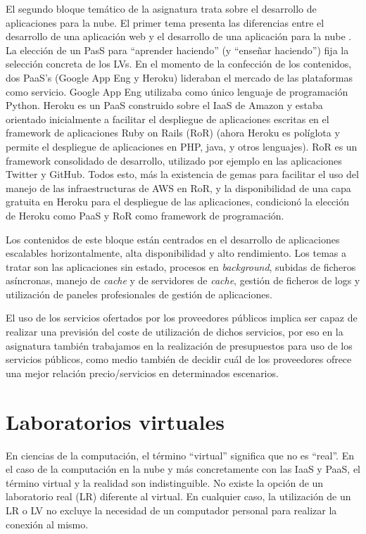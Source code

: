 \documentclass[conference]{IEEEtran}
\begin{document}
El segundo bloque temático de la asignatura trata sobre el desarrollo de aplicaciones para la
nube. El primer tema presenta las diferencias entre el desarrollo de una
aplicación web y el desarrollo de una aplicación para la nube
\cite{Heroku:2013,Wilder:2012}. La elección de un PasS para ``aprender
haciendo'' (y ``enseñar haciendo'') fija la selección concreta
de los LVs. En el momento de la confección de los contenidos, dos PaaS's
(Google App Eng \cite{Severance:2009} y Heroku) lideraban el mercado de las
plataformas como servicio. Google App Eng utilizaba como único lenguaje de
programación Python. Heroku es un PaaS construido sobre el IaaS de Amazon y estaba
orientado inicialmente a facilitar el despliegue de  aplicaciones escritas
en el framework de aplicaciones Ruby on Rails (RoR) \cite{Hartl:2012} (ahora
Heroku es políglota y permite el despliegue de aplicaciones en PHP, java,
y otros lenguajes). RoR es un framework consolidado de desarrollo, utilizado por ejemplo en
las aplicaciones Twitter y GitHub. Todos esto, más la existencia de gemas para
facilitar el uso del manejo de las infraestructuras de AWS en RoR, y la
disponibilidad de una capa gratuita en Heroku para el despliegue de las
aplicaciones, condicionó la elección de Heroku como PaaS y RoR como framework de
programación.

Los contenidos de este bloque están centrados en el desarrollo de aplicaciones escalables horizontalmente, alta disponibilidad y alto rendimiento.
Los temas a tratar son las aplicaciones sin estado, procesos en \textit{background}, subidas de ficheros asíncronas,
manejo de \textit{cache} y  de servidores de \textit{cache},
gestión de ficheros de logs y utilización de paneles profesionales de gestión de aplicaciones.

 

El uso de los servicios ofertados por los
proveedores públicos implica ser capaz de realizar una previsión del coste de
utilización de dichos servicios, por eso en la asignatura también trabajamos en la
realización de presupuestos para uso de los servicios públicos, como medio
también de decidir cuál de los proveedores ofrece una mejor relación
precio/servicios en determinados escenarios.



\section{Laboratorios virtuales \label{sec:laboratorios_virtuales}}

En ciencias de la computación, el término ``virtual'' significa que no es ``real''.
En el caso de la computación en la nube y más concretamente con las IaaS y PaaS, el término virtual y la realidad son indistinguible.
No existe la opción de un laboratorio real (LR) diferente al virtual. En cualquier caso, la utilización de un LR o LV no excluye la necesidad de un computador personal para realizar la conexión al mismo.
\end{document}
